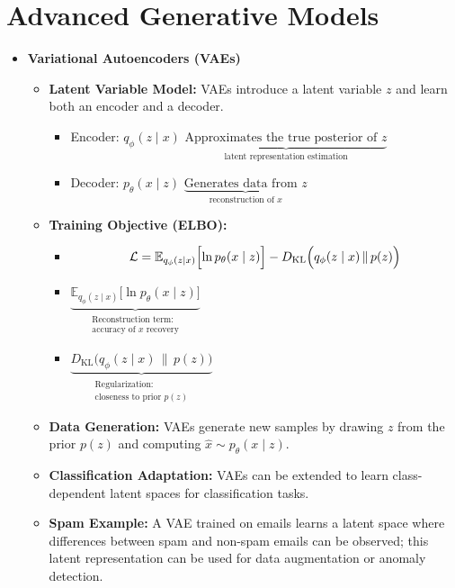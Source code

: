 \documentclass[10pt]{article}
\begin{document}
\pagebreak
\section{Advanced Generative Models}

\begin{itemize}
    \item \textbf{Variational Autoencoders (VAEs)}
    \begin{itemize}
        \item \textbf{Latent Variable Model:} VAEs introduce a latent variable \(z\) and learn both an encoder and a decoder.
        \begin{itemize}
            \item Encoder: \(q_\phi(z \mid x)\) \quad \(\underbrace{\text{Approximates the true posterior of } z}_{\text{latent representation estimation}}\)
            \item Decoder: \(p_\theta(x \mid z)\) \quad \(\underbrace{\text{Generates data from } z}_{\text{reconstruction of } x}\)
        \end{itemize}
        \item \textbf{Training Objective (ELBO):}
        \begin{itemize}
            \item \[
              \mathcal{L} = \mathbb{E}_{q_{\phi}(z \mid x)}\Bigl[\ln p_{\theta}(x \mid z)\Bigr] - D_{\text{KL}}\Bigl(q_{\phi}(z \mid x) \,\|\, p(z)\Bigr)
              \]
            \item \(\underbrace{\mathbb{E}_{q_{\phi}(z \mid x)}\big[\ln p_{\theta}(x \mid z)\big]}_{\substack{\text{Reconstruction term:}\\\text{accuracy of } x \text{ recovery}}}\)
            \item \(\underbrace{D_{\text{KL}}\bigl(q_{\phi}(z \mid x)\,\|\,p(z)\bigr)}_{\substack{\text{Regularization:}\\\text{closeness to prior } p(z)}}\)
        \end{itemize}
        \item \textbf{Data Generation:} VAEs generate new samples by drawing \(z\) from the prior \(p(z)\) and computing \( \hat{x} \sim p_\theta(x \mid z)\).
        \item \textbf{Classification Adaptation:} VAEs can be extended to learn class-dependent latent spaces for classification tasks.
        \item \textbf{Spam Example:} A VAE trained on emails learns a latent space where differences between spam and non-spam emails can be observed; this latent representation can be used for data augmentation or anomaly detection.
    \end{itemize}
    

\end{itemize}
\end{document}

